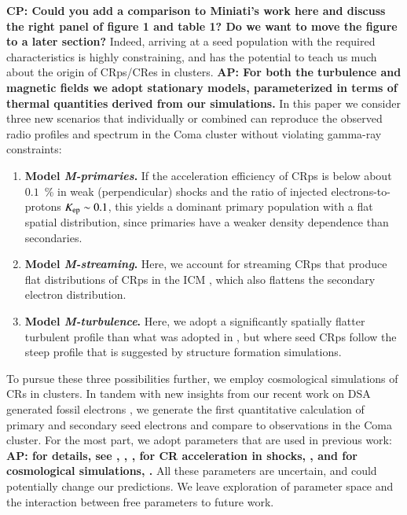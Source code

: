 \documentclass[useAMS,usenatbib]{mn2e}
\def\AP#1{{\bf  AP: #1}}
\def\CP#1{{\bf {\color{mygreen} CP: #1}}}
\begin{document}
\CP{Could you add a comparison to Miniati's work here and discuss the
  right panel of figure 1 and table 1? Do we want to move the figure
  to a later section?}  Indeed, arriving at a seed population with the
required characteristics is highly constraining, and has the potential
to teach us much about the origin of CRps/CRes in clusters. \AP{For
  both the turbulence and magnetic fields we adopt stationary models,
  parameterized in terms of thermal quantities derived from our
  simulations.} In this paper we consider three new scenarios that
individually or combined can reproduce the observed radio profiles and
spectrum in the Coma cluster without violating gamma-ray constraints:
\begin{enumerate}
\item {\bf Model {\em M-primaries}.} If the acceleration efficiency of CRps is below
  about $0.1$~{\%} in weak (perpendicular) shocks and the ratio of injected
  electrons-to-protons $K_{{\mathrm{ep}}} \sim 0.1$, this yields a dominant primary
  population with a flat spatial distribution, since primaries have a weaker
  density dependence than secondaries.
\item {\bf Model {\em M-streaming}.} Here, we account for streaming CRps that
  produce flat distributions of CRps in the ICM
  \citep{ensslin11,wiener13,2014MNRAS.438..124Z}, which also flattens the
  secondary electron distribution.
\item {\bf Model {\em M-turbulence}.} Here, we adopt a significantly spatially
  flatter turbulent profile than what was adopted in \citet{brunetti12},
  but where seed CRps follow the steep profile that is suggested by
  structure formation simulations.
\end{enumerate}

To pursue these three possibilities further, we employ cosmological
simulations of CRs in clusters. In tandem with new insights from our
recent work on DSA generated fossil electrons \citep{pinzke13}, we
generate the first quantitative calculation of primary and secondary
seed electrons and compare to observations in the Coma cluster. For
the most part, we adopt parameters that are used in previous work:
\AP{for details, see \citep[][ turbulent
    spectrum]{brunetti07,brunetti11}, \citep[][ injection scale of
    turbulens]{2015ApJ...800...60M}, \citep[][ energy density of
    turbulence]{2009ApJ...705.1129L,2010ApJ...725.1452S,2011A&A...529A..17V},
  for CR acceleration in shocks, \citep[][ in particular
    $K_{\rmn{ep}}$, acceleration efficiency]{pinzke13}, and for
  cosmological simulations, \citep[][ i.e., shock history, temperature
    profile, density profile, magnetic field profile]{pinzke10}.} All
these parameters are uncertain, and could potentially change our
predictions. We leave exploration of parameter space and the
interaction between free parameters to future work.
\end{document}
